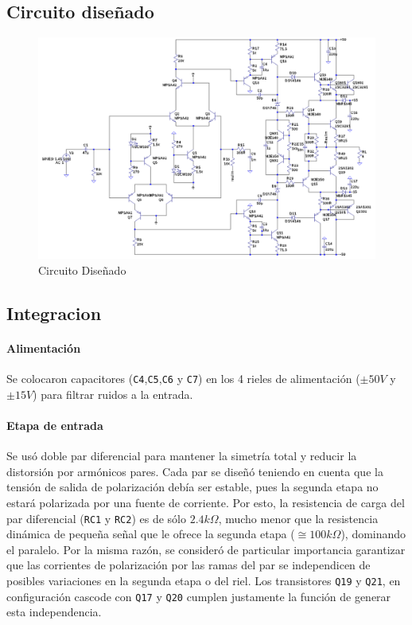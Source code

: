 \documentclass[a4paper,12pt,twoside]{article}
\begin{document}
\newpage


\subsection{Circuito diseñado}


\begin{figure}[H]
\centering
\includegraphics[width=0.75\paperheight,angle=90,origin=c]{img/circuito}
\caption{Circuito Diseñado}
\label{fig:circuito} 
\end{figure}

\subsection{Integracion}
\paragraph{Alimentación}

Se colocaron capacitores (\texttt{C4},\texttt{C5},\texttt{C6} y \texttt{C7}) en los 4 rieles de alimentación ($\pm 50V$ y $\pm 15V$) para filtrar ruidos a la entrada.

\paragraph{Etapa de entrada}

Se usó doble par diferencial para mantener la simetría total y reducir la distorsión por armónicos pares. Cada par se diseñó teniendo en cuenta que la tensión de salida de polarización debía ser estable, pues la segunda etapa no estará polarizada por una fuente de corriente. Por esto, la resistencia de carga del par diferencial (\texttt{RC1} y \texttt{RC2}) es de sólo $2.4k\Omega$, mucho menor que la resistencia dinámica de pequeña señal que le ofrece la segunda etapa ($\cong 100k\Omega$), dominando el paralelo.
Por la misma razón, se consideró de particular importancia garantizar que las corrientes de polarización por las ramas del par se independicen de posibles variaciones en la segunda etapa o del riel. Los transistores \texttt{Q19} y \texttt{Q21}, en configuración cascode con \texttt{Q17} y \texttt{Q20} cumplen justamente la función de generar esta independencia.
\end{document}
